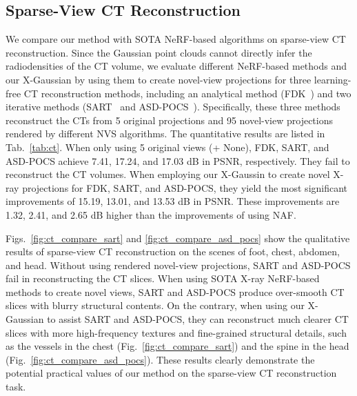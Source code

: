 \documentclass[runningheads]{llncs}
\begin{document}
\vspace{-3mm}
\subsection{Sparse-View CT Reconstruction}
\vspace{-1mm}

We compare our method with SOTA NeRF-based algorithms on sparse-view CT reconstruction. Since the Gaussian point clouds cannot directly infer the radiodensities of the CT volume, we evaluate different NeRF-based methods and our X-Gaussian by using them to create novel-view projections for three learning-free CT reconstruction methods, including an analytical method (FDK~\cite{fdk}) and two iterative methods (SART~\cite{sart} and ASD-POCS~\cite{asd_pocs}). Specifically, these three methods reconstruct the CTs from 5 original projections and 95 novel-view projections rendered by different NVS algorithms. The quantitative results are listed in Tab.~\ref{tab:ct}. When only using 5 original views (+ None), FDK, SART, and ASD-POCS achieve 7.41, 17.24, and 17.03 dB in PSNR, respectively. They fail to reconstruct the CT volumes. When employing our X-Gaussin to create novel X-ray projections for FDK, SART, and ASD-POCS, they yield the most significant improvements of 15.19, 13.01, and 13.53 dB in PSNR. These improvements are 1.32, 2.41, and 2.65 dB higher than the improvements of using NAF.

Figs.~\ref{fig:ct_compare_sart} and \ref{fig:ct_compare_asd_pocs} show the qualitative results of sparse-view CT reconstruction on the scenes of foot, chest, abdomen, and head. Without using rendered novel-view projections, SART and ASD-POCS fail in reconstructing the CT slices. When using SOTA X-ray NeRF-based methods to create novel views, SART and ASD-POCS produce over-smooth CT slices with blurry structural contents. On the contrary, when using our X-Gaussian to assist SART and ASD-POCS, they can reconstruct much clearer CT slices with more high-frequency textures and fine-grained structural details, such as the vessels in the chest (Fig.~\ref{fig:ct_compare_sart}) and the spine in the head (Fig.~\ref{fig:ct_compare_asd_pocs}). These results clearly demonstrate the potential practical values of our method on the sparse-view CT reconstruction task.
\end{document}
